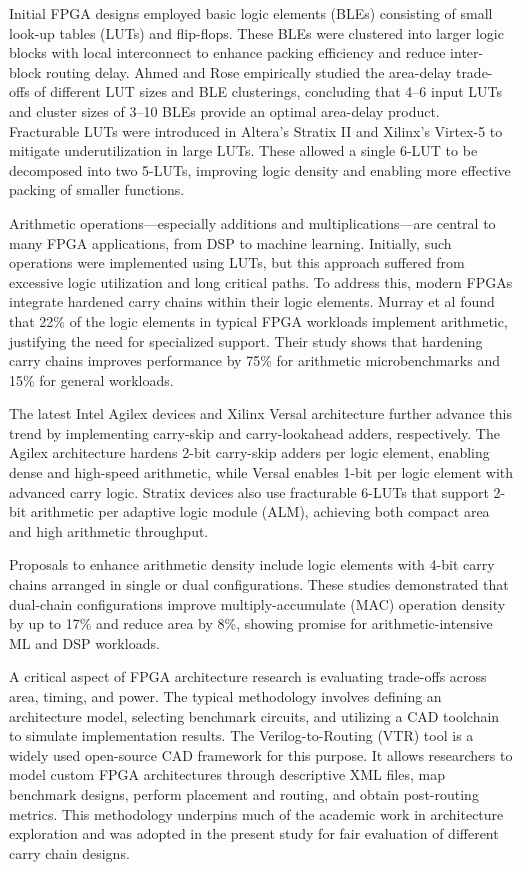 Initial FPGA designs employed basic logic elements (BLEs) consisting of small look-up tables (LUTs) and flip-flops. These BLEs were clustered into larger logic blocks with local interconnect to enhance packing efficiency and reduce inter-block routing delay. Ahmed and Rose\cite{ahmed2000effect} empirically studied the area-delay trade-offs of different LUT sizes and BLE clusterings, concluding that 4–6 input LUTs and cluster sizes of 3–10 BLEs provide an optimal area-delay product. Fracturable LUTs were introduced in Altera’s Stratix II\cite{stratix2007stratix} and Xilinx’s Virtex-5\cite{xilinxvirtex} to mitigate underutilization in large LUTs. These allowed a single 6-LUT to be decomposed into two 5-LUTs, improving logic density and enabling more effective packing of smaller functions.

Arithmetic operations—especially additions and multiplications—are central to many FPGA applications, from DSP to machine learning. Initially, such operations were implemented using LUTs, but this approach suffered from excessive logic utilization and long critical paths. To address this, modern FPGAs integrate hardened carry chains within their logic elements. Murray et al\cite{boutros2019math} found that 22\% of the logic elements in typical FPGA workloads implement arithmetic, justifying the need for specialized support. Their study shows that hardening carry chains improves performance by 75\% for arithmetic microbenchmarks and 15\% for general workloads.

The latest Intel Agilex devices\cite{intel_agilex_2020} and Xilinx Versal architecture\cite{xilinx_versal_trm_2021} further advance this trend by implementing carry-skip and carry-lookahead adders, respectively. The Agilex architecture hardens 2-bit carry-skip adders per logic element, enabling dense and high-speed arithmetic, while Versal enables 1-bit per logic element with advanced carry logic. Stratix devices also use fracturable 6-LUTs that support 2-bit arithmetic per adaptive logic module (ALM), achieving both compact area and high arithmetic throughput.

Proposals to enhance arithmetic density include logic elements with 4-bit carry chains arranged in single or dual configurations\cite{boutros2019math}\cite{boutros2021fpga}. These studies demonstrated that dual-chain configurations improve multiply-accumulate (MAC) operation density by up to 17\% and reduce area by 8\%, showing promise for arithmetic-intensive ML and DSP workloads.

A critical aspect of FPGA architecture research is evaluating trade-offs across area, timing, and power. The typical methodology involves defining an architecture model, selecting benchmark circuits, and utilizing a CAD toolchain to simulate implementation results\cite{boutros2021fpga}. The Verilog-to-Routing (VTR) tool\cite{rose2012vtr} is a widely used open-source CAD framework for this purpose. It allows researchers to model custom FPGA architectures through descriptive XML files, map benchmark designs, perform placement and routing, and obtain post-routing metrics. This methodology underpins much of the academic work in architecture exploration and was adopted in the present study for fair evaluation of different carry chain designs.


